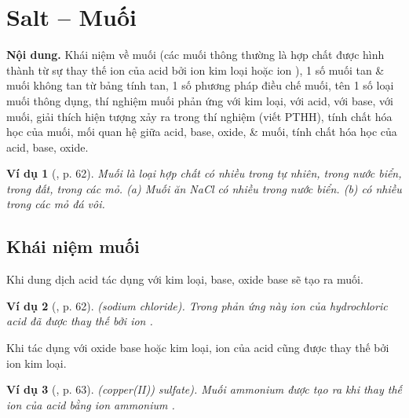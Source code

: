 \documentclass{article}
\newtheorem{vidu}{Ví dụ}
\begin{document}
\noindent{}


\section{Salt -- Muối}
\textsf{\textbf{Nội dung.} Khái niệm về muối (các muối thông thường là hợp chất được hình thành từ sự thay thế ion  của acid bởi ion kim loại hoặc ion ), 1 số muối tan \& muối không tan từ bảng tính tan, 1 số phương pháp điều chế muối, tên 1 số loại muối thông dụng, thí nghiệm muối phản ứng với kim loại, với acid, với base, với muối, giải thích hiện tượng xảy ra trong thí nghiệm (viết PTHH), tính chất hóa học của muối, mối quan hệ giữa acid, base, oxide, \& muối, tính chất hóa học của acid, base, oxide.}

\begin{vidu}[\cite{SGK_KHTN_8_Canh_Dieu}, p. 62]
	Muối là loại hợp chất có nhiều trong tự nhiên, trong nước biển, trong đất, trong các mỏ. (a) Muối ăn {\rm NaCl} có nhiều trong nước biển. (b) {\rm{}} có nhiều trong các mỏ đá vôi.
\end{vidu}

\subsection{Khái niệm muối}
Khi dung dịch acid tác dụng với kim loại, base, oxide base sẽ tạo ra muối.

\begin{vidu}[\cite{SGK_KHTN_8_Canh_Dieu}, p. 62]
	{\rm{}} (sodium chloride). Trong phản ứng này ion {\rm{}} của hydrochloric acid đã được thay thế bởi ion {\rm{}}.
\end{vidu}
Khi tác dụng với oxide base hoặc kim loại, ion  của acid cũng được thay thế bởi ion kim loại.

\begin{vidu}[\cite{SGK_KHTN_8_Canh_Dieu}, p. 63]
	{\rm{}} (copper(II)) sulfate). Muối ammonium được tạo ra khi thay thế ion {\rm{}} của acid bằng ion ammonium {\rm{}}.
\end{vidu}
\end{document}
